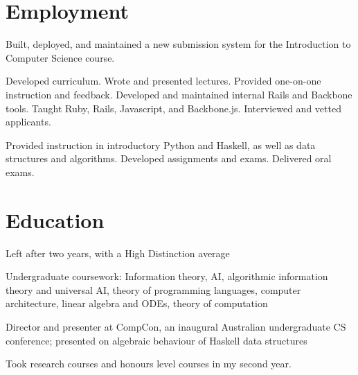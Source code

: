 \documentclass[letterpaper]{resume}
\begin{document}
\author{Buck Shlegeris}
\maketitle

\section{Employment}

\begin{compactitem}
\item Built, deployed, and maintained a new submission system for the Introduction to Computer Science course.
\end{compactitem}


\begin{compactitem}
\item Developed curriculum. Wrote and presented lectures. Provided one-on-one instruction and feedback. Developed and maintained internal Rails and Backbone tools. Taught Ruby, Rails, Javascript, and Backbone.js. Interviewed and vetted applicants.

\end{compactitem}


\begin{compactitem}
\item Provided instruction in introductory Python and Haskell, as well as data structures and algorithms. Developed assignments and exams. Delivered oral exams.

\end{compactitem}


\section{Education}


\begin{compactitem}
\item Left after two years, with a High Distinction average
\item Undergraduate coursework: Information theory, AI, algorithmic information theory and universal AI, theory of programming languages, computer architecture, linear algebra and ODEs, theory of computation
\item Director and presenter at CompCon, an inaugural Australian undergraduate CS conference; presented on algebraic behaviour of Haskell data structures
\item Took research courses and honours level courses in my second year.
\end{compactitem}
\end{document}
